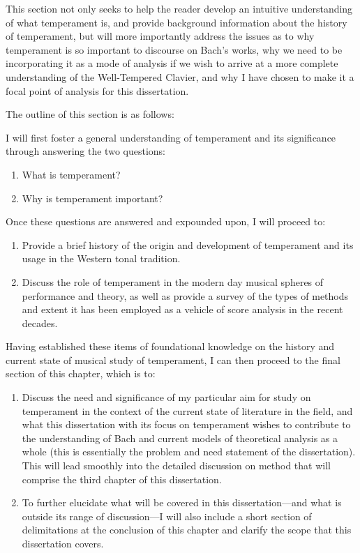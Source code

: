 This section not only seeks to help the reader develop an intuitive
understanding of what temperament is, and provide background information
about the history of temperament, but will more importantly address the
issues as to why temperament is so important to discourse on Bach's
works, why we need to be incorporating it as a mode of analysis if we
wish to arrive at a more complete understanding of the Well-Tempered
Clavier, and why I have chosen to make it a focal point of analysis for
this dissertation.

The outline of this section is as follows:

I will first foster a general understanding of temperament and its
significance through answering the two questions:

\begin{enumerate}
\def\labelenumi{\arabic{enumi}.}
\tightlist
\item
  What is temperament?
\item
  Why is temperament important?
\end{enumerate}

Once these questions are answered and expounded upon, I will proceed to:

\begin{enumerate}
\def\labelenumi{\arabic{enumi}.}
\setcounter{enumi}{2}
\tightlist
\item
  Provide a brief history of the origin and development of temperament
  and its usage in the Western tonal tradition.
\item
  Discuss the role of temperament in the modern day musical spheres of
  performance and theory, as well as provide a survey of the types of
  methods and extent it has been employed as a vehicle of score analysis
  in the recent decades.
\end{enumerate}

Having established these items of foundational knowledge on the history
and current state of musical study of temperament, I can then proceed to
the final section of this chapter, which is to:

\begin{enumerate}
\def\labelenumi{\arabic{enumi}.}
\setcounter{enumi}{4}
\tightlist
\item
  Discuss the need and significance of my particular aim for study on
  temperament in the context of the current state of literature in the
  field, and what this dissertation with its focus on temperament wishes
  to contribute to the understanding of Bach and current models of
  theoretical analysis as a whole (this is essentially the problem and
  need statement of the dissertation). This will lead smoothly into the
  detailed discussion on method that will comprise the third chapter of
  this dissertation.
\item
  To further elucidate what will be covered in this dissertation---and
  what is outside its range of discussion---I will also include a short
  section of delimitations at the conclusion of this chapter and clarify
  the scope that this dissertation covers.
\end{enumerate}

